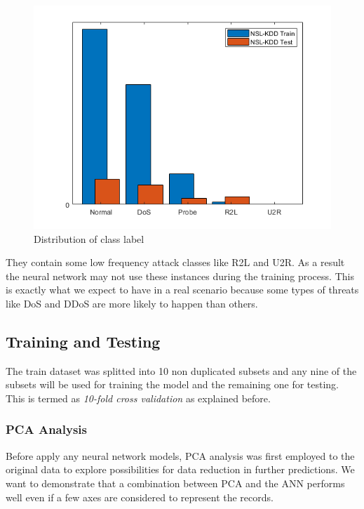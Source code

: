 \documentclass[twocolumn,11pt]{asme2ej}
\begin{document}
\begin{figure}[h]
\centering
\includegraphics[scale=0.52]{class_label2.png}
\caption{Distribution of class label}
\end{figure}
They contain some low frequency attack classes like R2L and U2R. As a result the neural network may not use these instances during the training process. This is exactly what we expect to have in a real scenario because some types of threats like DoS and DDoS are more likely to happen than others.


\subsection{Training and Testing}

The train dataset was splitted into 10 non duplicated subsets and any nine of the subsets will be used for training the model and the remaining one for testing. This is termed as \textit{10-fold cross validation} as explained before.

\subsubsection{PCA Analysis}

Before apply any neural network models, PCA analysis was first employed to the original data to explore possibilities for data reduction in further predictions. We want to demonstrate that a combination between PCA and the ANN performs well even if a few axes are considered to represent the records. 
\end{document}
